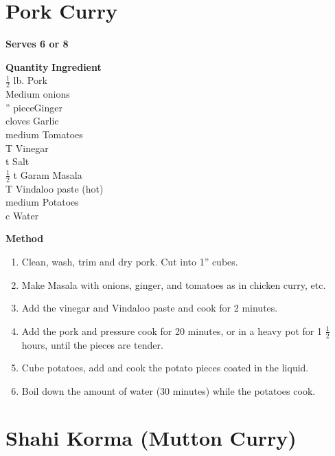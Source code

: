\section{Pork Curry}                    
{\bf Serves 6 or 8}

\begin{tabbing}
\hspace{1.0cm}  \={\bf Quantity}   \hspace{3.0cm} \={\bf Ingredient}\\

 $\frac{1}{2}$ lb. \>Pork\\
 \>Medium onions\\
'' piece\>Ginger\\
 cloves \>Garlic\\
 medium \>Tomatoes\\
 T \>Vinegar\\
 t \>Salt\\
\>$\frac{1}{2}$ t \>Garam Masala\\
 T \>Vindaloo paste (hot)\\
 medium \>Potatoes\\
 c \>Water\\
\end{tabbing}

{\bf Method}
\begin{enumerate}
\item Clean, wash, trim and dry pork.  Cut into 1'' cubes.
\item Make Masala with onions, ginger, and tomatoes as in chicken curry, etc.
\item Add the vinegar and Vindaloo paste and cook for 2 minutes.
\item  Add the pork and pressure cook for 20 minutes, or in a heavy pot for 1 $\frac{1}{2}$
hours, until the pieces are tender.
\item Cube potatoes, add and cook the potato pieces coated in the liquid.
\item Boil down the amount of water (30 minutes) while the potatoes cook.
\end{enumerate}


\section{Shahi Korma (Mutton Curry)}

